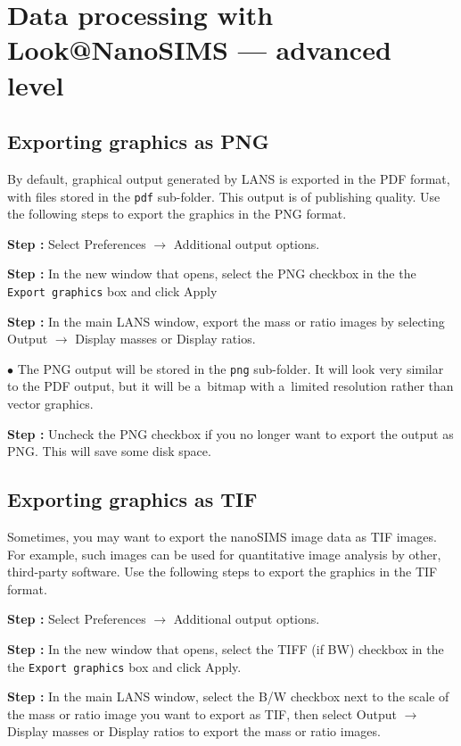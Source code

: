 \documentclass[a4paper, 11pt]{article}
\newcommand{\ttt}[1]{\texttt{#1}}
\newcommand{\lans}[1]{{\color{magenta}#1}}
\newcommand{\lanscb}[1]{{\color{darkgreen}#1}}
\newcommand{\lanstf}[1]{{\color{cyan}#1}}
\newcommand\ra{\rightarrow}
\newcounter{step}
\newcommand\s{\addtocounter{step}{1}\vskip5pt\noindent\textbf{Step \thestep:}{ }}
\newcommand\bul{\vskip5pt\noindent$\bullet${ }}
\begin{document}

\section{Data processing with Look@NanoSIMS --- advanced level}
\label{sec:level3}


\subsection{Exporting graphics as PNG}
\setcounter{step}{0}

By default, graphical output generated by LANS is exported in the PDF format, with files stored in the \ttt{pdf} sub-folder. This output is of publishing quality. Use the following steps to export the graphics in the PNG format. 

\s Select \lans{Preferences} $\ra$ \lans{Additional output options}.

\s In the new window that opens, select the \lanscb{PNG} checkbox in the the \ttt{Export graphics} box and click \lans{Apply}

\s In the main LANS window, export the mass or ratio images by selecting \lans{Output} $\ra$ \lans{Display masses} or \lans{Display ratios}. 

\bul The PNG output will be stored in the \ttt{png} sub-folder. It will look very similar to the PDF output, but it will be  a~bitmap with a~limited resolution rather than vector graphics.

\s Uncheck the \lanscb{PNG} checkbox if you no longer want to export the output as PNG. This will save some disk space.

\subsection{Exporting graphics as TIF}
\setcounter{step}{0}

Sometimes, you may want to export the nanoSIMS image data as TIF images. For example, such images can be used for quantitative image analysis by other, third-party software.  Use the following steps to export the graphics in the TIF format. 

\s Select \lans{Preferences} $\ra$ \lans{Additional output options}.

\s In the new window that opens, select the \lanscb{TIFF (if BW)} checkbox in the the \ttt{Export graphics} box and click \lans{Apply}.

\s In the main LANS window, select the \lanscb{B/W} checkbox next to the \lanstf{scale} of the mass or ratio image you want to export as TIF, then select \lans{Output} $\ra$ \lans{Display masses} or \lans{Display ratios} to export the mass or ratio images.
\end{document}

